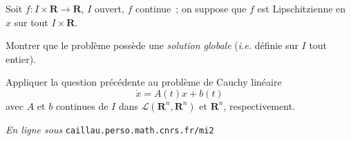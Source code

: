 \documentclass[11pt,a4paper]{article}
\def\R{\mathbf{R}}
\def\ie{\emph{i.e.}}
\theoremstyle{plain}
\theoremstyle{definition}
\begin{document}
\begin{Exercice} Soit $f : I \times \R \to \R$, $I$ ouvert, $f$ continue~;
on suppose que $f$ est Lipschitzienne en $x$ sur tout $I \times \R$.

\begin{Question}
Montrer que le probl\`eme poss\`ede une
\emph{solution globale} (\ie{} d\'efinie
sur $I$ tout entier).
\end{Question}

\begin{Question} Appliquer la question pr\'ec\'edente au probl\`eme de
Cauchy lin\'eaire
$$ \dot{x}=A(t)x+b(t)$$
avec $A$ et $b$ continues
de $I$ dans $\mathscr{L}(\R^n,\R^n)$ et $\R^n$, respectivement. 
\end{Question}
\end{Exercice} 

\vfill \begin{flushright}{\footnotesize \emph{En ligne sous}
\texttt{caillau.perso.math.cnrs.fr/mi2}} \end{flushright}
\end{document}
